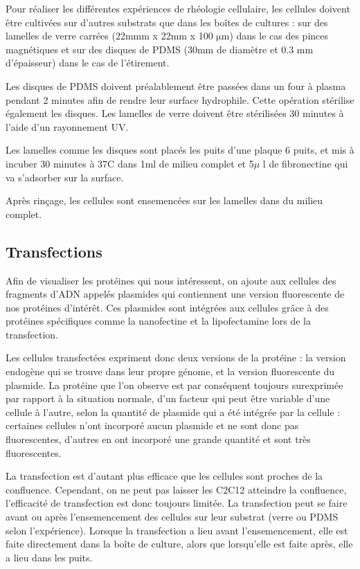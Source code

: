 \documentclass{report}
\newcommand{\micro}{$\mathrm{\mu}$}
\begin{document}
	Pour réaliser les différentes expériences de rhéologie cellulaire, les cellules doivent être cultivées sur d'autres substrats que dans les boîtes de cultures : sur des lamelles de verre carrées (22mmm x 22mm x 100 \micro m) dans le cas des pinces magnétiques et sur des disques de PDMS (30mm de diamètre et 0.3 mm d'épaisseur) dans le cas de l'étirement. 
	
	Les disques de PDMS doivent préalablement être passées dans un four à plasma pendant 2 minutes afin de rendre leur surface hydrophile. Cette opération stérilise également les disques. Les lamelles de verre doivent être stérilisées 30 minutes à l'aide d'un rayonnement UV. 
	
	Les lamelles comme les disques sont placés les puits d'une plaque 6 puits, et mis à incuber 30 minutes à 37\degres   C dans 1ml de milieu complet et 5$ \mu$ l de fibronectine qui va s'adsorber sur la surface. 
	
	Après rinçage, les cellules sont ensemencées sur les lamelles dans du milieu complet. 
	
	\subsection{Transfections}
	Afin de visualiser les protéines qui nous intéressent, on ajoute aux cellules des fragments d'ADN appelés plasmides qui contiennent une version fluorescente de nos protéines d'intérêt. Ces plasmides sont intégrées aux cellules grâce à des protéines spécifiques comme la nanofectine et la lipofectamine lors de la transfection. 
	
	Les cellules transfectées expriment donc deux versions de la protéine : la version endogène qui se trouve dans leur propre génome, et la version fluorescente du plasmide. La protéine que l'on observe est par conséquent toujours surexprimée par rapport à la situation normale, d'un facteur qui peut être variable d'une cellule à l'autre, selon la quantité de plasmide qui a été intégrée par la cellule : certaines cellules n'ont incorporé aucun plasmide et ne sont donc pas fluorescentes, d'autres en ont incorporé une grande quantité et sont très fluorescentes. 
	
	La transfection est d'autant plus efficace que les cellules sont proches de la confluence. Cependant, on ne peut pas laisser les C2C12 atteindre la confluence, l'efficacité de transfection est donc toujours limitée. La transfection peut se faire avant ou après l'ensemencement des cellules sur leur substrat (verre ou PDMS selon l'expérience). Lorsque la transfection a lieu avant l'ensemencement, elle est faite directement dans la boîte de culture, alors que lorsqu'elle est faite après, elle a lieu dans les puits. 
	
\end{document}
